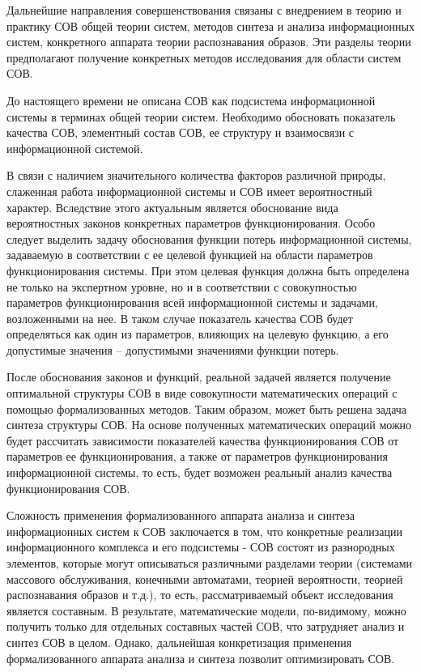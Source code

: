 
Дальнейшие направления совершенствования связаны с внедрением в теорию и практику СОВ общей теории систем, методов синтеза и анализа информационных систем, конкретного аппарата теории распознавания образов. Эти разделы теории предполагают получение конкретных методов исследования для области систем СОВ.

До настоящего времени не описана СОВ как подсистема информационной системы в терминах общей теории систем. Необходимо обосновать показатель качества СОВ, элементный состав СОВ, ее структуру и взаимосвязи с информационной системой.

В связи с наличием значительного количества факторов различной природы, слаженная работа информационной системы и СОВ имеет вероятностный характер. Вследствие этого актуальным является обоснование вида вероятностных законов конкретных параметров функционирования. Особо следует выделить задачу обоснования функции потерь информационной системы, задаваемую в соответствии с ее целевой функцией на области параметров функционирования системы. При этом целевая функция должна быть определена не только на экспертном уровне, но и в соответствии с совокупностью параметров функционирования всей информационной системы и задачами, возложенными на нее. В таком случае показатель качества СОВ будет определяться как один из параметров, влияющих на целевую функцию, а его допустимые значения -- допустимыми значениями функции потерь.

После обоснования законов и функций, реальной задачей является получение оптимальной структуры СОВ в виде совокупности математических операций с помощью формализованных методов. Таким образом, может быть решена задача синтеза структуры СОВ. На основе полученных математических операций можно будет рассчитать зависимости показателей качества функционирования СОВ от параметров ее функционирования, а также от параметров функционирования информационной системы, то есть, будет возможен реальный анализ качества функционирования СОВ.

Сложность применения формализованного аппарата анализа и синтеза информационных систем к СОВ заключается в том, что конкретные реализации информационного комплекса и его подсистемы - СОВ состоят из разнородных элементов, которые могут описываться различными разделами теории (системами массового обслуживания, конечными автоматами, теорией вероятности, теорией распознавания образов и т.д.), то есть, рассматриваемый объект исследования является составным. В результате, математические модели, по-видимому, можно получить только для отдельных составных частей СОВ, что затрудняет анализ и синтез СОВ в целом. Однако, дальнейшая конкретизация применения формализованного аппарата анализа и синтеза позволит оптимизировать СОВ.

